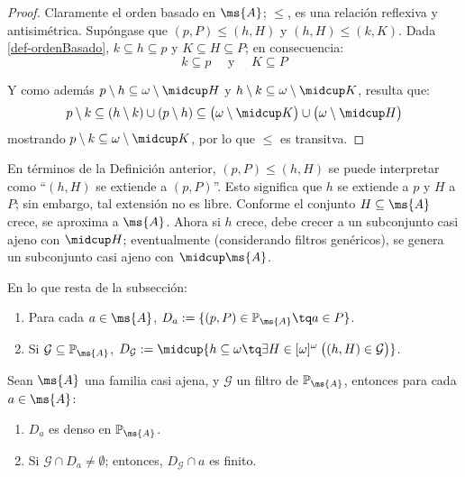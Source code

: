 	\begin{proof}
		Claramente el orden basado en $\ms{A}$; $\leq$, es una relación reflexiva y antisimétrica. Supóngase que $(p,P) \leq (h,H)$ y $(h,H) \leq (k,K)$. Dada \ref{def-ordenBasado}, $k \subseteq h \subseteq p$ y $K \subseteq H \subseteq P$; en consecuencia:
		\[ k \subseteq p \quad \text{ y } \quad K \subseteq P \]
		
		Y como además $p \setminus h \subseteq \omega \setminus \midcup H$ y $h \setminus k \subseteq \omega \setminus \midcup K$, resulta que:
		$$ p \setminus k \subseteq (h \setminus k) \cup (p \setminus h) \subseteq \big( \omega \setminus \midcup K \big) \cup \big( \omega \setminus \midcup H \big) $$
		mostrando $p \setminus k \subseteq \omega \setminus \midcup K$, por lo que $\leq$ es transitva. 
	\end{proof}

	En términos de la Definición anterior, $(p,P) \leq (h,H)$ se puede interpretar como ``$(h,H)$ se extiende a $(p,P)$''. Esto significa que $h$ se extiende a $p$ y $H$ a $P$; sin embargo, tal extensión no es libre. Conforme el conjunto $H \subseteq \ms{A}$ crece, se aproxima a $\ms{A}$. Ahora si $h$ crece, debe crecer a un subconjunto casi ajeno con $\midcup H$; eventualmente (considerando filtros genéricos), se genera un subconjunto casi ajeno con $\midcup \ms{A}$.

	\begin{consideracion}
		En lo que resta de la subsección:
		\begin{enumerate}
			\item Para cada $a \in \ms{A}$, $ D_a:=\{ (p,P) \in \mathbb{P}_\ms{A} \tq a \in P\} $.
			\item Si $\mathcal{G} \subseteq \mathbb{P}_\ms{A}$, $ D_\mathcal{G}:=\midcup\{ h \subseteq \omega \tq \exists H \in [\omega]^{\omega} \: \big( (h,H) \in \mathcal{G} \big) \} $.
		\end{enumerate}
	\end{consideracion}

	\begin{lema}\label{lem-DgMagia}
		Sean $\ms{A}$ una familia casi ajena, y $\mathcal{G}$ un filtro de $\mathbb{P}_\ms{A}$, entonces para cada $a \in \ms{A}$:
		\begin{enumerate}
			\item $D_a$ es denso en $\mathbb{P}_\ms{A}$.
			\item Si $\mathcal{G} \cap D_a \neq \emptyset$; entonces, $D_\mathcal{G} \cap a$ es finito.
		\end{enumerate}
	\end{lema}

